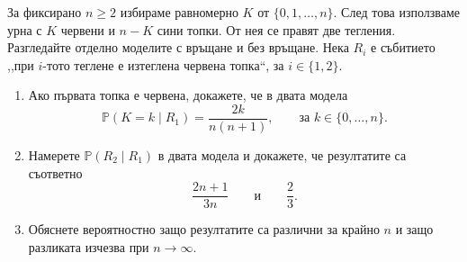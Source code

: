 \documentclass[11pt,a4paper]{article}
\newenvironment{enumeratea}{\begin{enumerate}[label=(\alph*),itemsep=0.28em,topsep=0.25em]}{\end{enumerate}}
\newcommand{\Pbb}{\mathbb P}
\newcounter{problem}[section]
\begin{document}
\begin{problemstar}
За фиксирано $n\ge2$ избираме равномерно $K$ от $\{0,1,\dots,n\}$.
След това използваме урна с $K$ червени и $n-K$ сини топки.
От нея се правят две тегления. Разгледайте отделно моделите с връщане
и без връщане. Нека $R_i$ е събитието ,,при $i$-тото теглене е изтеглена
червена топка``, за $i\in\{1,2\}$.
\begin{enumeratea}
  \item Ако първата топка е червена, докажете, че в двата модела
  \[
  \Pbb(K=k\mid R_1)=\frac{2k}{n(n+1)},
  \qquad
  \text{за }k\in\{0,\dots,n\}.
  \]

  \item Намерете $\Pbb(R_2\mid R_1)$ в двата модела и докажете, че
  резултатите са съответно
  \[
  \frac{2n+1}{3n}
  \qquad\text{и}\qquad
  \frac23.
  \]

  \item Обяснете вероятностно защо резултатите са различни за крайно $n$
  и защо разликата изчезва при $n\to\infty$.
\end{enumeratea}
\end{problemstar}
\end{document}
